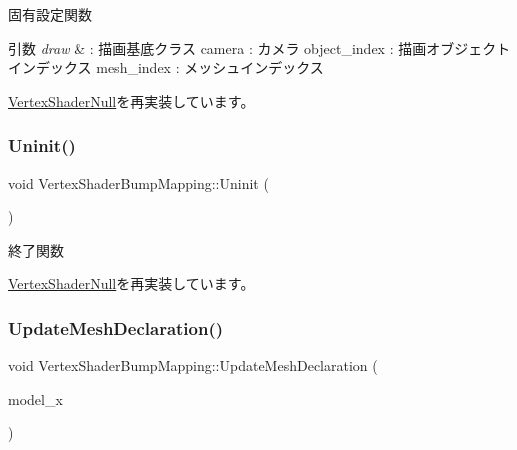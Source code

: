 固有設定関数 


\begin{DoxyParams}{引数}
{\em draw} & \+: 描画基底クラス camera \+: カメラ object\+\_\+index \+: 描画オブジェクトインデックス mesh\+\_\+index \+: メッシュインデックス \\
\hline
\end{DoxyParams}


\mbox{\hyperlink{class_vertex_shader_null_aa2234c6ea083e3c0233d59f222145992}{Vertex\+Shader\+Null}}を再実装しています。

\mbox{\label{class_vertex_shader_bump_mapping_abed4e0aa9655fa7a7a21e03d00e7c0e5}} 
\subsubsection{\texorpdfstring{Uninit()}{Uninit()}}
{\footnotesize\ttfamily void Vertex\+Shader\+Bump\+Mapping\+::\+Uninit (\begin{DoxyParamCaption}{ }\end{DoxyParamCaption})\hspace{0.3cm}{\ttfamily [virtual]}}



終了関数 



\mbox{\hyperlink{class_vertex_shader_null_a16334df4ac02db3dd63f042622032301}{Vertex\+Shader\+Null}}を再実装しています。

\mbox{\label{class_vertex_shader_bump_mapping_a659d50e57533b9cd0204fc169985f1e0}} 
\subsubsection{\texorpdfstring{Update\+Mesh\+Declaration()}{UpdateMeshDeclaration()}}
{\footnotesize\ttfamily void Vertex\+Shader\+Bump\+Mapping\+::\+Update\+Mesh\+Declaration (\begin{DoxyParamCaption}\item[{\mbox{\hyperlink{class_model_x_object}{Model\+X\+Object}} $\ast$}]{model\+\_\+x }\end{DoxyParamCaption})\hspace{0.3cm}{\ttfamily [static]}}



